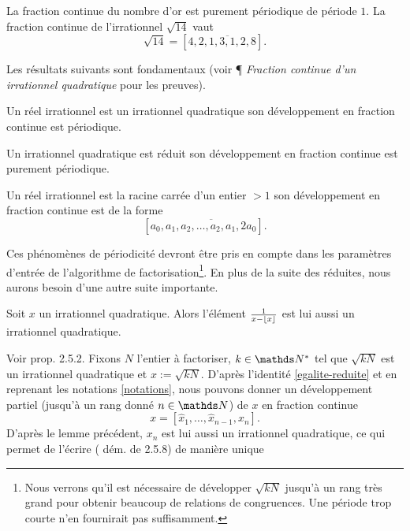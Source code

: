 \begin{exemple}
	La fraction continue du nombre d'or est purement périodique de période $1$.
	La fraction continue de l'irrationnel $\sqrt{14}$ vaut \[\sqrt{14} = [4,
	\overline{2, 1, 3, 1, 2, 8}].\]
\end{exemple}

Les résultats suivants sont fondamentaux (voir \cite{wikiu} ¶ \emph{Fraction
continue d'un irrationnel quadratique} pour les preuves).

\begin{theoreme}[Lagrange, 1770]
	Un réel irrationnel est un irrationnel quadratique \ssi son développement en
	fraction continue est périodique.
\end{theoreme}

\begin{theoreme}[Galois, 1829]
	Un irrationnel quadratique est réduit \ssi son développement en fraction
	continue est purement périodique.
\end{theoreme}

\begin{theoreme}[Legendre, 1798]
	Un réel irrationnel est la racine carrée d'un entier $>1$ \ssi son
	développement en fraction continue est de la forme \[[a_0, \overline{a_1,
	a_2, \dots, a_2, a_1, 2a_0}].\]
\end{theoreme}

Ces phénomènes de périodicité devront être pris en compte dans les paramètres
d'entrée de l'algorithme de factorisation\footnote{Nous verrons qu'il est
nécessaire de développer $\sqrt{kN}$ jusqu'à un rang très grand pour obtenir
beaucoup de relations de congruences. Une période trop courte n'en fournirait
pas suffisamment.}. En plus de la suite des réduites, nous aurons
besoin d'une autre suite importante.

\begin{lemme}
	Soit $x$ un irrationnel quadratique. Alors l'élément $\frac{1}{x - \lfloor x\rfloor}$
	est lui aussi un irrationnel quadratique.
\end{lemme}

Voir \cite{Lauritzen} prop. 2.5.2. Fixons $N$ l'entier à factoriser, $k\in \N^*$
tel que $\sqrt{kN}$ est un irrationnel quadratique et $x := \sqrt{kN}$. D'après
l'identité \ref{egalite-reduite} et en reprenant les notations \ref{notations},
nous pouvons donner un développement partiel (jusqu'à un rang donné $n\in \N$)
de $x$ en fraction continue \[x = [\hat{x}_1, \dots, \hat{x}_{n-1}, x_n].\]
D'après le lemme précédent, $x_n$ est lui aussi un irrationnel quadratique,
ce qui permet de l'écrire (\cite{Lauritzen} dém. de 2.5.8) de manière unique 

